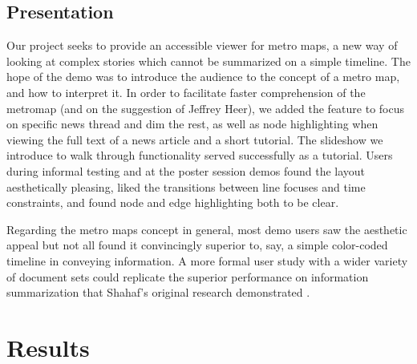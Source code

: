 \documentclass{chi2009}
\begin{document}
\subsection{Presentation}

Our project seeks to provide an accessible viewer for metro maps, a new way of looking at complex stories which cannot be summarized on a simple timeline. The hope of the demo was to introduce the audience to the concept of a metro map, and how to interpret it.  In order to facilitate faster comprehension of the metromap (and on the suggestion of Jeffrey Heer), we added the feature to focus on specific news thread and dim the rest, as well as node highlighting when viewing the full text of a news article and a short tutorial.   The slideshow we introduce to walk through functionality served successfully as a tutorial. Users during informal testing and at the poster session demos found the layout aesthetically pleasing, liked the transitions between line focuses and time constraints, and found node and edge highlighting both to be clear.

Regarding the metro maps concept in general, most demo users saw the aesthetic appeal but not all found it convincingly superior to, say, a simple color-coded timeline in conveying information. A more formal user study with a wider variety of document sets could replicate the superior performance on information summarization that Shahaf’s original research demonstrated \cite{}.

\section{Results}
\end{document}
